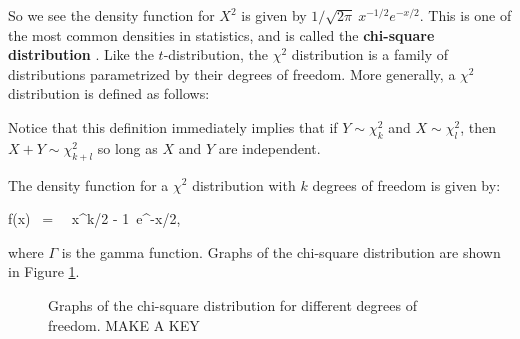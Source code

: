 \eel

So we see the density function for $X^2$ is given by $1/\sqrt{2\pi}\ x^{-1/2}e^{-x/2}$.  This is one of the most common densities in statistics, and is called the \textbf{chi-square distribution} .  Like the $t$-distribution, the $\chi^2$ distribution is a family of distributions parametrized by their degrees of freedom.  More generally, a $\chi^2$ distribution is defined as follows:



\begin{table}[h]

\begin{center}


\end{center}

\end{table}

Notice that this definition immediately implies that if $Y \sim \chi^2_k$ and $X \sim \chi^2_l$, then $X + Y \sim \chi^2_{k+l}$ so long as $X$ and $Y$ are independent.



The density function for a $\chi^2$  distribution with $k$ degrees of freedom is given by:



\bel

f(x) \ = \  \ x^{k/2 - 1}\ e^{-x/2},

\eel

where $\Gamma$ is the gamma function.  Graphs of the chi-square distribution are shown in Figure \ref{fig:chisquaredist}.



\begin{figure}

\begin{center}


\caption{\label{fig:chisquaredist} Graphs of the chi-square distribution for different degrees of freedom.  MAKE A KEY}

\end{center}\end{figure}



